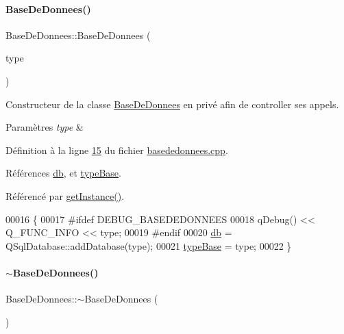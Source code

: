 \paragraph{\texorpdfstring{Base\+De\+Donnees()}{BaseDeDonnees()}}
{\footnotesize\ttfamily Base\+De\+Donnees\+::\+Base\+De\+Donnees (\begin{DoxyParamCaption}\item[{Q\+String}]{type }\end{DoxyParamCaption})\hspace{0.3cm}{\ttfamily [private]}}



Constructeur de la classe \hyperlink{class_base_de_donnees}{Base\+De\+Donnees} en privé afin de controller ses appels. 


\begin{DoxyParams}{Paramètres}
{\em type} & \\
\hline
\end{DoxyParams}


Définition à la ligne \hyperlink{basededonnees_8cpp_source_l00015}{15} du fichier \hyperlink{basededonnees_8cpp_source}{basededonnees.\+cpp}.



Références \hyperlink{basededonnees_8h_source_l00030}{db}, et \hyperlink{basededonnees_8h_source_l00028}{type\+Base}.



Référencé par \hyperlink{basededonnees_8cpp_source_l00031}{get\+Instance()}.


\begin{DoxyCode}
00016 \{
00017 \textcolor{preprocessor}{    #ifdef DEBUG\_BASEDEDONNEES}
00018     qDebug() << Q\_FUNC\_INFO << type;
00019 \textcolor{preprocessor}{    #endif}
00020     \hyperlink{class_base_de_donnees_a3e738dcf443370c46a541677ab619f06}{db} = QSqlDatabase::addDatabase(type);
00021     \hyperlink{class_base_de_donnees_ab682b82167f494496a6531bfe522b42b}{typeBase} = type;
00022 \}
\end{DoxyCode}
\mbox{\label{class_base_de_donnees_a5dc474cdbe003644fb0ca7b8f2ec6b93}} 
\paragraph{\texorpdfstring{$\sim$\+Base\+De\+Donnees()}{~BaseDeDonnees()}}
{\footnotesize\ttfamily Base\+De\+Donnees\+::$\sim$\+Base\+De\+Donnees (\begin{DoxyParamCaption}{ }\end{DoxyParamCaption})\hspace{0.3cm}{\ttfamily [private]}}



